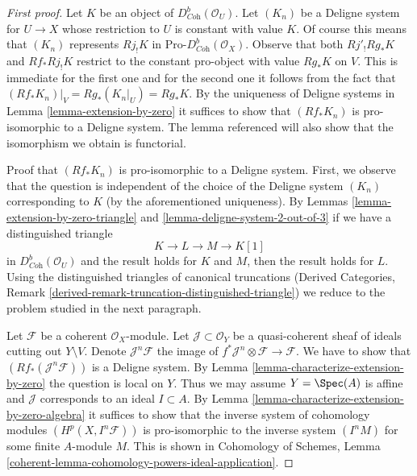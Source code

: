 \begin{proof}[First proof]
Let $K$ be an object of $D^b_{\textit{Coh}}(\mathcal{O}_U)$. Let $(K_n)$
be a Deligne system for $U \to X$ whose restriction to $U$ is constant
with value $K$. Of course this means that $(K_n)$ represents $Rj_!K$
in $\text{Pro-}D^b_{\textit{Coh}}(\mathcal{O}_X)$. Observe that
both $Rj'_!Rg_*K$ and $Rf_*Rj_!K$ restrict to the constant pro-object with
value $Rg_*K$ on $V$. This is immediate for the first one and for the second
one it follows from the fact that $(Rf_*K_n)|_V = Rg_*(K_n|_U) = Rg_*K$.
By the uniqueness of Deligne systems in Lemma \ref{lemma-extension-by-zero}
it suffices to show that $(Rf_*K_n)$ is pro-isomorphic to a
Deligne system. The lemma referenced will also show that the
isomorphism we obtain is functorial.

\medskip\noindent
Proof that $(Rf_*K_n)$ is pro-isomorphic to a Deligne system.
First, we observe that the question is independent of the choice
of the Deligne system $(K_n)$ corresponding to $K$ (by the aforementioned
uniqueness). By Lemmas \ref{lemma-extension-by-zero-triangle} and
\ref{lemma-deligne-system-2-out-of-3}
if we have a distinguished triangle
$$
K \to L \to M \to K[1]
$$
in $D^b_{\textit{Coh}}(\mathcal{O}_U)$ and the result holds for
$K$ and $M$, then the result holds for $L$. Using the distinguished
triangles of canonical truncations (Derived Categories, Remark
\ref{derived-remark-truncation-distinguished-triangle})
we reduce to the problem studied in the next paragraph.

\medskip\noindent
Let $\mathcal{F}$ be a coherent $\mathcal{O}_X$-module.
Let $\mathcal{J} \subset \mathcal{O}_Y$ be a quasi-coherent
sheaf of ideals cutting out $Y \setminus V$. Denote
$\mathcal{J}^n\mathcal{F}$ the image of
$f^*\mathcal{J}^n \otimes \mathcal{F} \to \mathcal{F}$.
We have to show that $(Rf_*(\mathcal{J}^n\mathcal{F}))$
is a Deligne system. By Lemma \ref{lemma-characterize-extension-by-zero}
the question is local on $Y$. Thus we may assume $Y = \Spec(A)$ is affine
and $\mathcal{J}$ corresponds to an ideal $I \subset A$. By
Lemma \ref{lemma-characterize-extension-by-zero-algebra}
it suffices to show that the inverse system of cohomology modules
$(H^p(X, I^n\mathcal{F}))$ is pro-isomorphic to the inverse system
$(I^n M)$ for some finite $A$-module $M$.
This is shown in Cohomology of Schemes, Lemma
\ref{coherent-lemma-cohomology-powers-ideal-application}.
\end{proof}

